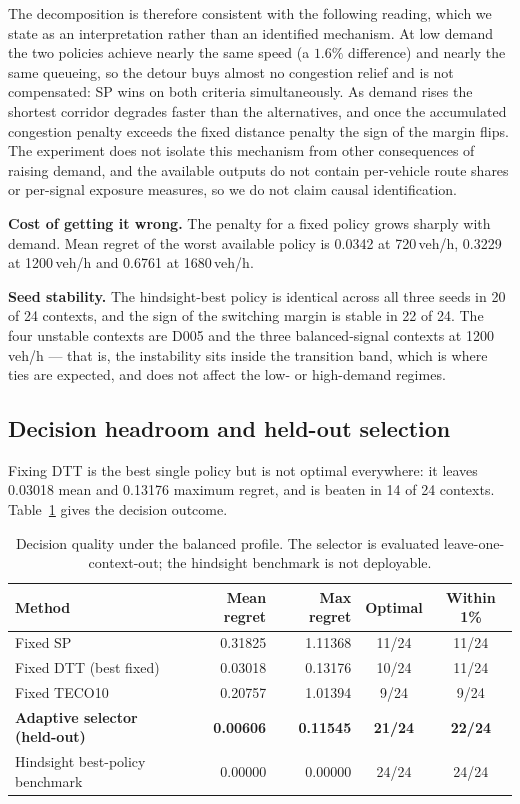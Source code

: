 \documentclass[10pt,a4paper]{article}
\begin{document}
The decomposition is therefore consistent with the following reading, which we state as an interpretation rather than an identified mechanism. At low demand the two policies achieve nearly the same speed (a $1.6\%$ difference) and nearly the same queueing, so the detour buys almost no congestion relief and is not compensated: SP wins on both criteria simultaneously. As demand rises the shortest corridor degrades faster than the alternatives, and once the accumulated congestion penalty exceeds the fixed distance penalty the sign of the margin flips. The experiment does not isolate this mechanism from other consequences of raising demand, and the available outputs do not contain per-vehicle route shares or per-signal exposure measures, so we do not claim causal identification.

\textbf{Cost of getting it wrong.} The penalty for a fixed policy grows sharply with demand. Mean regret of the worst available policy is 0.0342 at 720\,veh/h, 0.3229 at 1200\,veh/h and 0.6761 at 1680\,veh/h.

\textbf{Seed stability.} The hindsight-best policy is identical across all three seeds in 20 of 24 contexts, and the sign of the switching margin is stable in 22 of 24. The four unstable contexts are D005 and the three balanced-signal contexts at 1200\,veh/h --- that is, the instability sits inside the transition band, which is where ties are expected, and does not affect the low- or high-demand regimes.

\subsection{Decision headroom and held-out selection}
Fixing DTT is the best single policy but is not optimal everywhere: it leaves 0.03018 mean and 0.13176 maximum regret, and is beaten in 14 of 24 contexts. Table~\ref{tab:decision} gives the decision outcome.

\begin{table}[htbp]\centering\small
\caption{Decision quality under the balanced profile. The selector is evaluated leave-one-context-out; the hindsight benchmark is not deployable.}\label{tab:decision}
\begin{tabular}{lrrcc}\toprule
Method & Mean regret & Max regret & Optimal & Within 1\% \\\midrule
Fixed SP & 0.31825 & 1.11368 & 11/24 & 11/24 \\
Fixed DTT (best fixed) & 0.03018 & 0.13176 & 10/24 & 11/24 \\
Fixed TECO10 & 0.20757 & 1.01394 & 9/24 & 9/24 \\
\textbf{Adaptive selector (held-out)} & \textbf{0.00606} & \textbf{0.11545} & \textbf{21/24} & \textbf{22/24} \\
Hindsight best-policy benchmark & 0.00000 & 0.00000 & 24/24 & 24/24 \\
\bottomrule\end{tabular}\end{table}
\end{document}
